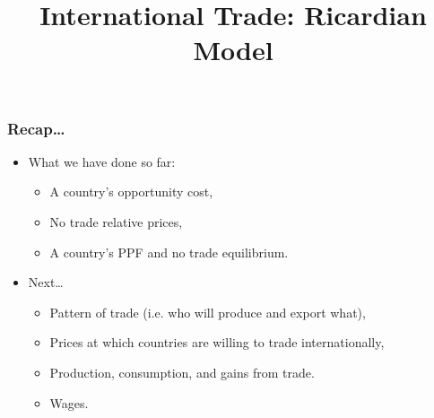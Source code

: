 \documentclass[handout]{beamer}
\title[NYU Stern] %
{\Large International Trade: Ricardian Model}
\author[Michael Waugh] %
{\bf{\Large}}%
\date[] %
\begin{document}
\begin{frame}
  \titlepage
\end{frame}


\begin{frame}[t]
\frametitle{Recap\ldots}
\bigskip
\begin{itemize}
\item What we have done so far:
\begin{itemize}
\medskip
\item A country's opportunity cost,
\medskip
\item No trade relative prices,
\medskip
\item A country's PPF and no trade equilibrium.
\end{itemize}
\bigskip
\item Next\ldots
\begin{itemize}
\medskip
\item Pattern of trade (i.e. who will produce and export what),
\medskip
\item Prices at which countries are willing to trade internationally,
\medskip
\item Production, consumption, and gains from trade.
\medskip
\item Wages.
\end{itemize}
\end{itemize}
\end{frame}

\end{document}
